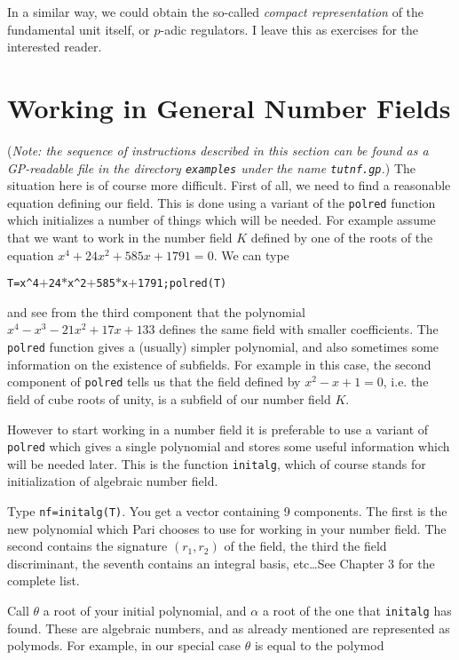 In a similar way, we could obtain the so-called {\it compact representation}
of the fundamental unit itself, or $p$-adic regulators. I leave this as
exercises for the interested reader.
\medskip
\section{Working in General Number Fields}
\medskip
({\sl Note: the sequence of instructions described in this section can be found
as a GP-readable file in the directory {\tt examples} under the name
{\tt tutnf.gp}.})
\smallskip
The situation here is of course more difficult. First of all, we need to find a
reasonable equation defining our field. This is done using a variant of the
{\tt polred} function which initializes a number of things which will be
needed. For example assume that we want to work in the number field $K$ defined
by one of the roots of the equation $x^4+24x^2+585x+1791=0$. We can type

\centerline{\tt T=x\^{}4$+$24$*$x\^{}2$+$585$*$x$+$1791;polred(T)}

and see from 
the third component that the polynomial $x^4-x^3-21x^2+17x+133$ defines the
same field with smaller coefficients. The {\tt polred} function gives a 
(usually) simpler polynomial, and also sometimes some information on 
the existence of subfields. For example in this case, the second component of
{\tt polred} tells us that the field defined by $x^2-x+1=0$, i.e. the field
of cube roots of unity, is a subfield of our number field $K$. 

However to start working in a number field it is preferable to use a variant of
{\tt polred} which gives a single polynomial and stores some useful
information which will be needed later. This is the function {\tt initalg},
which of course stands for initialization of algebraic number field.

Type {\tt nf=initalg(T)}. You get a vector containing 9 components.
The first is the new polynomial which Pari chooses
to use for working in your number field. The second contains the signature
$(r_1,r_2)$ of the field, the third the field discriminant, the seventh
contains an integral basis, etc\dots See Chapter 3 for the complete list.

Call $\theta$ a root of your initial polynomial, and $\alpha$ a root of the
one that {\tt initalg} has found. These are algebraic numbers, and as already
mentioned are represented as polymods. For example, in our special case
$\theta$ is equal to the polymod 


